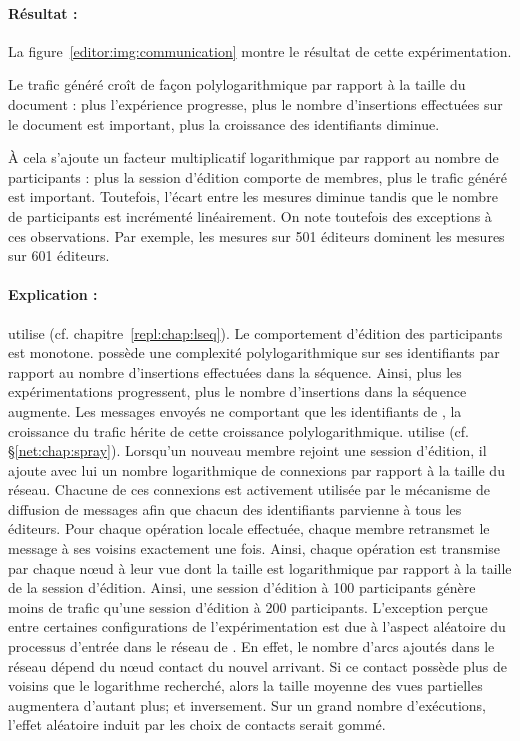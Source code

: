 \paragraph{Résultat :} La figure~\ref{editor:img:communication} montre le
résultat de cette expérimentation.
\begin{inparaenum}[(i)]
\item Le trafic généré croît de façon polylogarithmique par rapport à la taille
  du document : plus l'expérience progresse, plus le nombre d'insertions
  effectuées sur le document est important, plus la croissance des identifiants
  diminue.
\item À cela s'ajoute un facteur multiplicatif logarithmique par rapport au
  nombre de participants : plus la session d'édition comporte de membres, plus
  le trafic généré est important. Toutefois, l'écart entre les mesures diminue
  tandis que le nombre de participants est incrémenté linéairement. On note
  toutefois des exceptions à ces observations. Par exemple, les mesures sur 501
  éditeurs dominent les mesures sur 601 éditeurs.
\end{inparaenum}

\paragraph{Explication :} \CRATE utilise \LSEQ
(cf. chapitre~\ref{repl:chap:lseq}). Le comportement d'édition des participants
est monotone. \LSEQ possède une complexité polylogarithmique sur ses
identifiants par rapport au nombre d'insertions effectuées dans la
séquence. Ainsi, plus les expérimentations progressent, plus le nombre
d'insertions dans la séquence augmente. Les messages envoyés ne comportant que
les identifiants de \LSEQ, la croissance du trafic hérite de cette croissance
polylogarithmique. \CRATE utilise \SPRAY (cf. §\ref{net:chap:spray}). Lorsqu'un
nouveau membre rejoint une session d'édition, il ajoute avec lui un nombre
logarithmique de connexions par rapport à la taille du réseau. Chacune de ces
connexions est activement utilisée par le mécanisme de diffusion de messages
afin que chacun des identifiants parvienne à tous les éditeurs. Pour chaque
opération locale effectuée, chaque membre retransmet le message à ses voisins
exactement une fois. Ainsi, chaque opération est transmise par chaque nœud à
leur vue dont la taille est logarithmique par rapport à la taille de la session
d'édition. Ainsi, une session d'édition à 100 participants génère moins de
trafic qu'une session d'édition à 200 participants. L'exception perçue entre
certaines configurations de l'expérimentation est due à l'aspect aléatoire du
processus d'entrée dans le réseau de \SPRAY. En effet, le nombre d'arcs ajoutés
dans le réseau dépend du nœud contact du nouvel arrivant. Si ce contact possède
plus de voisins que le logarithme recherché, alors la taille moyenne des vues
partielles augmentera d'autant plus; et inversement.  Sur un grand nombre
d'exécutions, l'effet aléatoire induit par les choix de contacts serait gommé.



